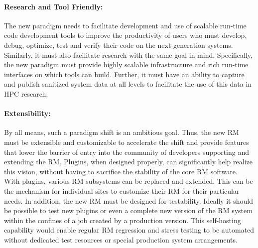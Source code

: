 \documentclass[10pt]{article}
\newcommand{\ngrm}{NGRM}
\begin{document}
\paragraph{Research and Tool Friendly:}
The new paradigm needs to facilitate development and use of 
scalable run-time code development tools to improve the productivity
of users who must develop, debug, optimize, test and verify their code
on the next-generation systems. 
Similarly, it must
also facilitate research with the same goal in mind.
Specifically, the new paradigm must provide highly scalable infrastructure
and rich run-time interfaces
on which tools can build. Further, it must have 
an ability to capture and publish sanitized system data at all levels to facilitate the use of
this data in HPC research. 


\paragraph{Extensibility:}
By all means, such a paradigm shift is an ambitious goal. Thus, 
the new RM must be extensible and customizable to accelerate the shift
and provide features that lower the barrier of entry into the
community of developers supporting and extending the RM.
Plugins, when designed properly, can significantly help realize this vision,
without having to sacrifice the stability of the core RM software. 
With plugins, various RM subsystems can be replaced and extended.  
This can be the mechanism for individual
sites to customize their RM for their particular needs. 
In addition, the new RM must be designed for testability.
Ideally it should be possible to test new plugins or even a complete
new version of the RM system within the confines of a job created by
a production version.  This self-hosting capability would enable regular
RM regression and stress testing to be automated without dedicated test
resources or special production system arrangements.

%
\end{document}
